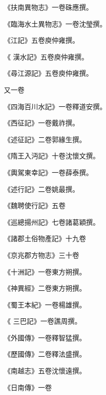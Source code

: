 \begin{pinyinscope}
 《扶南異物志》一卷硃應撰。



 《臨海水土異物志》一卷沈瑩撰。



 《江記》五卷庾仲雍撰。



 《
 漢水記》五卷庾仲雍撰。



 《尋江源記》五卷庾仲雍撰。



 又一卷



 《四海百川水記》一卷釋道安撰。



 《西征記》一卷戴祚撰。



 《述征記》二卷郭緣生撰。



 《隋王入沔記》十卷沈懷文撰。



 《輿駕東幸記》一卷薛泰撰。



 《述行記》二卷姚最撰。



 《魏聘使行記》五卷



 《巡總揚州記》七卷諸葛穎撰。



 《諸郡土俗物產記》十九卷



 《京兆郡方物志》三十卷



 《十洲記》一卷東方朔撰。



 《神異經》二卷東方朔撰。



 《蜀王本紀》一卷楊雄撰。



 《
 三巴記》一卷譙周撰。



 《外國傳》一卷釋智猛撰。



 《歷國傳》二卷釋法盛撰。



 《南越志》五卷沈懷遠撰。



 《日南傳》一卷




\end{pinyinscope}
